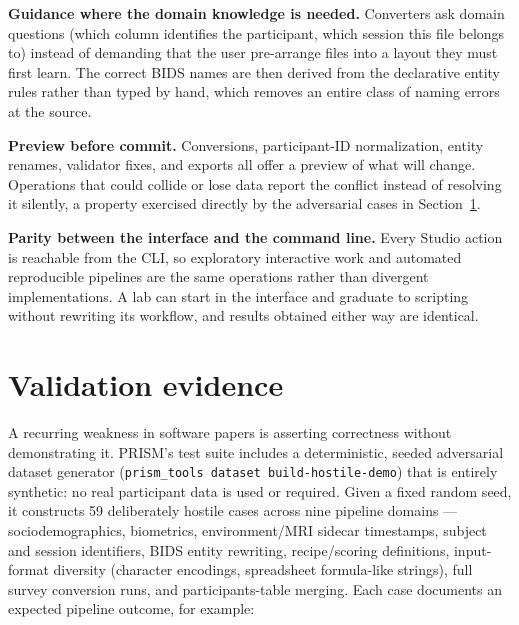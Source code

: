 \documentclass[10pt]{article}
\begin{document}
\textbf{Guidance where the domain knowledge is needed.} Converters ask
domain questions (which column identifies the participant, which session
this file belongs to) instead of demanding that the user pre-arrange files
into a layout they must first learn. The correct BIDS names are then derived
from the declarative entity rules rather than typed by hand, which removes
an entire class of naming errors at the source.

\textbf{Preview before commit.} Conversions, participant-ID normalization,
entity renames, validator fixes, and exports all offer a preview of what
will change. Operations that could collide or lose data report the conflict
instead of resolving it silently, a property exercised directly by the
adversarial cases in Section~\ref{sec:validation}.

\textbf{Parity between the interface and the command line.} Every Studio
action is reachable from the CLI, so exploratory interactive work and
automated reproducible pipelines are the same operations rather than
divergent implementations. A lab can start in the interface and graduate to
scripting without rewriting its workflow, and results obtained either way
are identical.

\section{Validation evidence}
\label{sec:validation}

A recurring weakness in software papers is asserting correctness without
demonstrating it. PRISM's test suite includes a deterministic, seeded
adversarial dataset generator (\texttt{prism\_tools dataset
build-hostile-demo}) that is entirely synthetic: no real participant data is
used or required. Given a fixed random seed, it constructs 59 deliberately
hostile cases across nine pipeline domains --- sociodemographics,
biometrics, environment/MRI sidecar timestamps, subject and session
identifiers, BIDS entity rewriting, recipe/scoring definitions,
input-format diversity (character encodings, spreadsheet formula-like
strings), full survey conversion runs, and participants-table merging.
Each case documents an expected pipeline outcome, for example:
\end{document}
